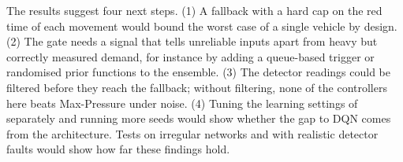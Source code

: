 The results suggest four next steps. (1) A fallback with a hard cap on the red time of each
movement would bound the worst case of a single vehicle by design. (2) The gate needs a signal
that tells unreliable inputs apart from heavy but correctly measured demand, for instance by
adding a queue-based trigger or randomised prior functions to the ensemble. (3) The detector
readings could be filtered before they reach the fallback; without filtering, none of the
controllers here beats Max-Pressure under noise. (4) Tuning the learning settings of \ugmarl{}
separately and running more seeds would show whether the gap to DQN comes from the
architecture. Tests on
irregular networks and with realistic detector faults would show how far these findings hold.
